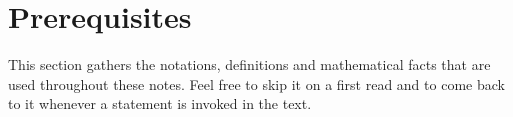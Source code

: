 \section{Prerequisites}

This section gathers the notations, definitions and mathematical facts that are used throughout these notes. Feel free to skip it on a first read and to come back to it whenever a statement is invoked in the text.

